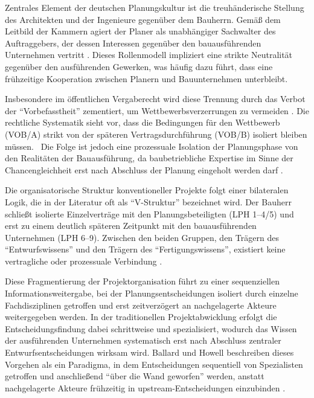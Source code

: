 Zentrales Element der deutschen Planungskultur ist die treuhänderische Stellung des Architekten und der Ingenieure gegenüber dem Bauherrn. Gemäß dem Leitbild der Kammern agiert der Planer als unabhängiger Sachwalter des Auftraggebers, der dessen Interessen gegenüber den bauausführenden Unternehmen vertritt \autocite[Vgl.][S.~43 ff]{girmscheid_projektabwicklung_2016}. Dieses Rollenmodell impliziert eine strikte Neutralität gegenüber den ausführenden Gewerken, was häufig dazu führt, dass eine frühzeitige Kooperation zwischen Planern und Bauunternehmen unterbleibt. 

Insbesondere im öffentlichen Vergaberecht wird diese Trennung durch das Verbot der \enquote{Vorbefasstheit} zementiert, um Wettbewerbsverzerrungen zu vermeiden \autocite[Vgl. \S~7 Abs.~2 \acs{VOB}/A; siehe auch][S.~15]{frohlich_vob_2003}. Die rechtliche Systematik sieht vor, dass die Bedingungen für den Wettbewerb (\acs{VOB}/A) strikt von der späteren Vertragsdurchführung (\acs{VOB}/B) isoliert bleiben müssen. \autocite[Vgl.][S.~4]{frohlich_vob_2003}\, \autocite[Vgl.][S.~4]{springer_fachmedien_wiesbaden_vob2019_2020} Die Folge ist jedoch eine prozessuale Isolation der Planungsphase von den Realitäten der Bauausführung, da baubetriebliche Expertise im Sinne der Chancengleichheit erst nach Abschluss der Planung eingeholt werden darf \autocite[Vgl.][S.~653]{girmscheid_projektabwicklung_2016}.

Die organisatorische Struktur konventioneller Projekte folgt einer bilateralen Logik, die in der Literatur oft als \enquote{V-Struktur} bezeichnet wird. Der Bauherr schließt isolierte Einzelverträge mit den Planungsbeteiligten (\acs{LPH} 1–4/5) und erst zu einem deutlich späteren Zeitpunkt mit den bauausführenden Unternehmen (\acs{LPH} 6–9). Zwischen den beiden Gruppen, den Trägern des \enquote{Entwurfswissens} und den Trägern des \enquote{Fertigungswissens}, existiert keine vertragliche oder prozessuale Verbindung \autocite[Vgl.][S.~12]{sommer_projektmanagement_2016}. 

Diese Fragmentierung der Projektorganisation führt zu einer sequenziellen Informationsweitergabe, bei der Planungsentscheidungen isoliert durch einzelne Fachdisziplinen getroffen und erst zeitverzögert an nachgelagerte Akteure weitergegeben werden. In der traditionellen Projektabwicklung erfolgt die Entscheidungsfindung dabei schrittweise und spezialisiert, wodurch das Wissen der ausführenden Unternehmen systematisch erst nach Abschluss zentraler Entwurfsentscheidungen wirksam wird. Ballard und Howell beschreiben dieses Vorgehen als ein Paradigma, in dem Entscheidungen sequentiell von Spezialisten getroffen und anschließend \enquote{über die Wand geworfen} werden, anstatt nachgelagerte Akteure frühzeitig in upstream-Entscheidungen einzubinden \autocite[Vgl.][S.~1 ff]{ballard_lean_2003}.

